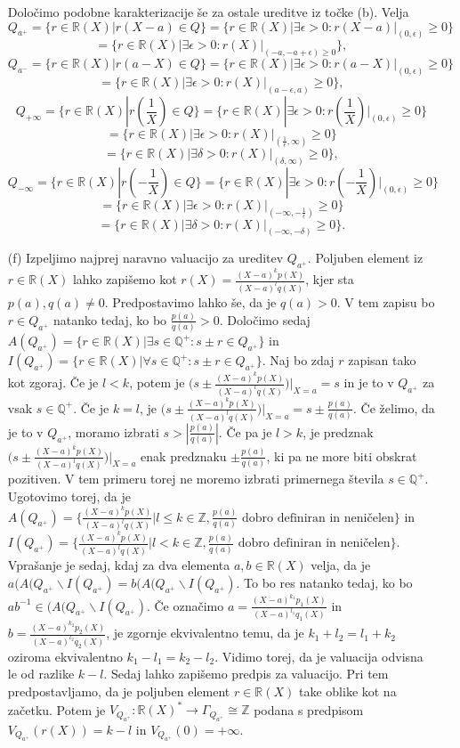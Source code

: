 \documentclass[a4paper, 12pt]{article}
\newcommand{\Z}{\mathbb{Z}}
\newcommand{\Q}{\mathbb{Q}}
\newcommand{\R}{\mathbb{R}}
\begin{document}
\begin{enumerate}
Določimo podobne karakterizacije še za ostale ureditve iz točke (b). Velja 
$$
Q_{a^+} = \{r\in \R(X)| r(X-a) \in Q\} = \{r\in \R(X)| \exists \epsilon >0: r(X-a)|_{(0,\epsilon)} \ge 0\}
$$
$$
= \{r\in \R(X)| \exists \epsilon >0: r(X)|_{(-a,-a+\epsilon) \ge 0}\},
$$
$$
Q_{a^-} = \{r\in \R(X)|r(a-X) \in Q\} =  \{ r\in \R(X)|\exists \epsilon >0: r(a-X)|_{(0,\epsilon)}\ge 0\}
$$
$$
= \{r\in \R(X)| \exists \epsilon >0: r(X)|_{(a-\epsilon,a)} \ge 0\},
$$
$$
Q_{+\infty} = \{r\in \R(X)|r(\frac{1}{X}) \in Q\} = \{r\in \R(X)|\exists \epsilon >0: r(\frac{1}{X})|_{(0,\epsilon)} \ge 0\}
$$
$$
= \{r\in \R(X)| \exists \epsilon >0 : r(X)|_{(\frac{1}{\epsilon},\infty)}\ge 0\} 
$$
$$
= \{r\in \R(X)| \exists \delta >0 : r(X)|_{(\delta,\infty)}\ge 0\},
$$
$$
Q_{-\infty} = \{r\in \R(X) | r(-\frac{1}{X}) \in Q\} = \{ r\in \R(X)| \exists \epsilon >0: r(-\frac{1}{X})|_{(0,\epsilon)} \ge 0 \}
$$
$$
= \{r\in \R(X)| \exists \epsilon >0 : r(X)|_{(-\infty, -\frac{1}{\epsilon})} \ge 0\}
$$
$$
=\{r\in \R(X)| \exists \delta > 0: r(X)|_{(-\infty,-\delta)} \ge 0\}.
$$
\item[(f)]
Izpeljimo najprej naravno valuacijo za ureditev $Q_{a^+}$. Poljuben element iz $r\in\R(X)$ lahko zapišemo kot $r(X)= \frac{(X-a)^k p(X)}{(X-a)^l q(X)}$, kjer sta $p(a), q(a)\neq 0$. Predpostavimo lahko še, da je $q(a)>0$. V tem zapisu bo $r\in Q_{a^+}$ natanko tedaj, ko bo $\frac{p(a)}{q(a)} >0$. Določimo sedaj $A(Q_{a^+}) = \{r\in \R(X)|\exists s\in \Q^+:s \pm r \in Q_{a^+}\}$ in $I(Q_{a^+}) = \{r\in \R(X)| \forall s\in \Q^+: s\pm r\in Q_{a^+}\}$. Naj bo zdaj $r$ zapisan tako kot zgoraj. Če je $l < k$, potem je $\big( s \pm \frac{(X-a)^k p(X)}{(X-a)^l q(X)} \big)|_{X=a} = s$ in je to v $Q_{a^+}$ za vsak $s\in \Q^+$. Če je $k=l$, je $\big( s \pm \frac{(X-a)^k p(X)}{(X-a)^l q(X)} \big)|_{X=a} = s \pm \frac{p(a)}{q(a)}$. Če želimo, da je to v $Q_{a^+}$, moramo izbrati $s> |\frac{p(a)}{q(a)}|$. Če pa je $l > k$, je predznak $\big( s \pm \frac{(X-a)^k p(X)}{(X-a)^l q(X)} \big)|_{X=a}$ enak predznaku $\pm \frac{p(a)}{q(a)}$, ki pa ne more biti obskrat pozitiven. V tem primeru torej ne moremo izbrati primernega števila $s\in \Q^+$. Ugotovimo torej, da je $A(Q_{a^+}) = \{ \frac{(X-a)^k p(X)}{(X-a)^l q(X)}|l \le k \in \Z, \frac{p(a)}{q(a)} \text{ dobro definiran in neničelen} \}$ in $I(Q_{a^+}) = \{ \frac{(X-a)^k p(X)}{(X-a)^l q(X)}|l < k \in \Z, \frac{p(a)}{q(a)} \text{ dobro definiran in neničelen} \}$. Vprašanje je sedaj, kdaj za dva elementa $a,b \in \R(X)$ velja, da je $a(A(Q_{a^+} \smallsetminus I(Q_{a^+}) = b(A(Q_{a^+} \smallsetminus I(Q_{a^+})$. To bo res natanko tedaj, ko bo $ab^{-1} \in (A(Q_{a^+} \smallsetminus I(Q_{a^+})$. Če označimo $a =  \frac{(X-a)^{k_1} p_1(X)}{(X-a)^{l_1} q_1(X)}$ in $b = \frac{(X-a)^{k_2} p_2(X)}{(X-a)^{l_2} q_2(X)}$, je zgornje ekvivalentno temu, da je $k_1 + l_2 = l_1 + k_2$ oziroma ekvivalentno $k_1 - l_1 = k_2 - l_2$. Vidimo torej, da je valuacija odvisna le od razlike $k-l$. Sedaj lahko zapišemo predpis za valuacijo. Pri tem predpostavljamo, da je poljuben element $r\in \R(X)$ take oblike kot na začetku. Potem je $V_{Q_{a^+}} : \R(X)^* \rightarrow \Gamma_{Q_{a^+}} \cong \Z$ podana s predpisom $V_{Q_{a^+}} (r(X)) = k-l$ in $V_{Q_{a^+}}(0) = +\infty$.


\end{enumerate}
\end{document}
